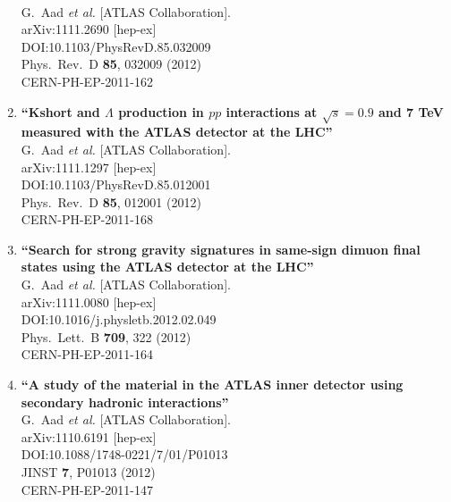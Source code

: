 \documentclass{article}
\begin{document}
\begin{enumerate}
  \\{}G.~Aad {\it et al.} [ATLAS Collaboration].
  \\{}arXiv:1111.2690 [hep-ex]
  \\{}DOI:10.1103/PhysRevD.85.032009
  \\{}Phys.\ Rev.\ D {\bf 85}, 032009 (2012)
  \\{}CERN-PH-EP-2011-162
\item%
{\bf ``Kshort and $\Lambda$ production in $pp$ interactions at $\sqrt{s}=0.9$ and 7 TeV measured with the ATLAS detector at the LHC''}
  \\{}G.~Aad {\it et al.} [ATLAS Collaboration].
  \\{}arXiv:1111.1297 [hep-ex]
  \\{}DOI:10.1103/PhysRevD.85.012001
  \\{}Phys.\ Rev.\ D {\bf 85}, 012001 (2012)
  \\{}CERN-PH-EP-2011-168
\item%
{\bf ``Search for strong gravity signatures in same-sign dimuon final states using the ATLAS detector at the LHC''}
  \\{}G.~Aad {\it et al.} [ATLAS Collaboration].
  \\{}arXiv:1111.0080 [hep-ex]
  \\{}DOI:10.1016/j.physletb.2012.02.049
  \\{}Phys.\ Lett.\ B {\bf 709}, 322 (2012)
  \\{}CERN-PH-EP-2011-164
\item%
{\bf ``A study of the material in the ATLAS inner detector using secondary hadronic interactions''}
  \\{}G.~Aad {\it et al.} [ATLAS Collaboration].
  \\{}arXiv:1110.6191 [hep-ex]
  \\{}DOI:10.1088/1748-0221/7/01/P01013
  \\{}JINST {\bf 7}, P01013 (2012)
  \\{}CERN-PH-EP-2011-147

\end{enumerate}
\end{document}

